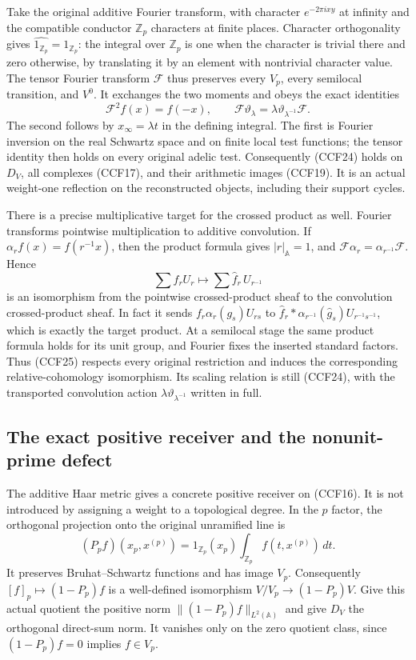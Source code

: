 \documentclass[11pt,a4paper]{article}
\theoremstyle{definition}\newtheorem{definition}[theorem]{Definition}
\begin{document}
Take the original additive Fourier transform, with character
$e^{-2\pi ixy}$ at infinity and the compatible conductor
$\mathbb Z_p$ characters at finite places. Character
orthogonality gives $\widehat{1_{\mathbb Z_p}}=1_{\mathbb Z_p}$:
the integral over $\mathbb Z_p$ is one when the character is
trivial there and zero otherwise, by translating it by an
element with nontrivial character value. The tensor Fourier
transform $\mathcal F$ thus preserves every $V_p$, every
semilocal transition, and $V^0$. It exchanges the two moments
and obeys the exact identities
\[
 \mathcal F^2f(x)=f(-x),\qquad
 \mathcal F\vartheta_\lambda
     =\lambda\vartheta_{\lambda^{-1}}\mathcal F.
 \tag{CCF24}
\]
The second follows by $x_\infty=\lambda t$ in the defining
integral. The first is Fourier inversion on the real Schwartz
space and on finite local test functions; the tensor identity
then holds on every original adelic test. Consequently
(CCF24) holds on $D_V$, all complexes (CCF17), and their
arithmetic images (CCF19). It is an actual weight-one reflection
on the reconstructed objects, including their support cycles.

There is a precise multiplicative target for the crossed
product as well. Fourier transforms pointwise multiplication
to additive convolution. If $\alpha_r f(x)=f(r^{-1}x)$, then
the product formula gives $|r|_{\mathbb A}=1$, and
$\mathcal F\alpha_r=\alpha_{r^{-1}}\mathcal F$. Hence
\[
 \sum f_rU_r\longmapsto\sum\widehat f_r\,U_{r^{-1}}
 \tag{CCF25}
\]
is an isomorphism from the pointwise crossed-product sheaf
to the convolution crossed-product sheaf. In fact it sends
$f_r\alpha_r(g_s)U_{rs}$ to
$\widehat f_r*\alpha_{r^{-1}}(\widehat g_s)U_{r^{-1}s^{-1}}$,
which is exactly the target product. At a semilocal stage the
same product formula holds for its unit group, and Fourier
fixes the inserted standard factors. Thus (CCF25) respects
every original restriction and induces the corresponding
relative-cohomology isomorphism. Its scaling relation is still
(CCF24), with the transported convolution action
$\lambda\vartheta_{\lambda^{-1}}$ written in full.

\subsection{The exact positive receiver and the nonunit-prime defect}

The additive Haar metric gives a concrete positive receiver
on (CCF16). It is not introduced by assigning a weight to a
topological degree. In the $p$ factor, the orthogonal projection
onto the original unramified line is
\[
 (P_pf)(x_p,x^{(p)})=1_{\mathbb Z_p}(x_p)
                \int_{\mathbb Z_p}f(t,x^{(p)})\,dt.
 \tag{CCF26}
\]
It preserves Bruhat--Schwartz functions and has image $V_p$.
Consequently $[f]_p\mapsto(1-P_p)f$ is a well-defined
isomorphism $V/V_p\to(1-P_p)V$. Give this actual quotient
the positive norm $\|(1-P_p)f\|_{L^2(\mathbb A)}$ and give
$D_V$ the orthogonal direct-sum norm. It vanishes only on the
zero quotient class, since $(1-P_p)f=0$ implies $f\in V_p$.
\end{document}
